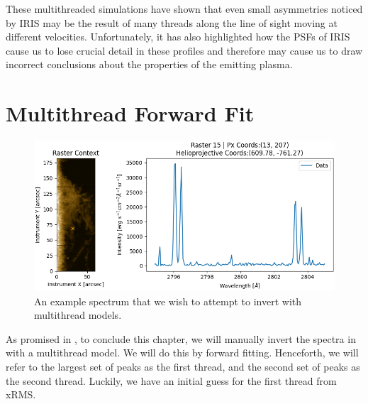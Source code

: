 These multithreaded simulations have shown that even small asymmetries noticed by IRIS may be the result of many threads along the line of sight moving at different velocities. Unfortunately, it has also highlighted how the PSFs of IRIS cause us to lose crucial detail in these profiles and therefore may cause us to draw incorrect conclusions about the properties of the emitting plasma. 

\section{Multithread Forward Fit}
\label{2dinvert}

\begin{figure}
    \centering
    \includegraphics[width=\linewidth]{./03Modelling2D/figs/invert/spectratoimvert.png}
    \caption{An example spectrum that we wish to attempt to invert with multithread models.}
    \label{spec2inv}
\end{figure}
As promised in , to conclude this chapter, we will manually invert the spectra in  with a multithread model. We will do this by forward fitting. Henceforth, we will refer to the largest set of peaks as the first thread, and the second set of peaks as the second thread. Luckily, we have an initial guess for the first thread from xRMS. 
